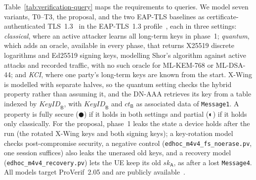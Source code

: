 \documentclass[symmetry,article,submit,moreauthors]{Definitions/mdpi}
\newcommand{\statuspartial}{\textcolor{orange!80!black}{$\LEFTcircle$}}  %
\newcommand{\statusfull}{\textcolor{green!60!black}{$\CIRCLE$}}          %
\begin{document}
Table~\ref{tab:verification-query} maps the requirements to queries. We model seven variants, T0--T3, the proposal, and the two EAP-TLS baselines as certificate-authenticated TLS~1.3~\cite{RFC9846} in the EAP-TLS~1.3 profile~\cite{RFC9190}, each in three settings: \emph{classical}, where an active attacker learns all long-term keys in phase~1; \emph{quantum}, which adds an oracle, available in every phase, that returns X25519 discrete logarithms and Ed25519 signing keys, modelling Shor's algorithm against active attacks and recorded traffic, with no such oracle for ML-KEM-768 or ML-DSA-44; and \emph{KCI}, where one party's long-term keys are known from the start. X-Wing is modelled with separate halves, so the quantum setting checks the hybrid property rather than assuming it, and the DN-AAA retrieves its key from a table indexed by $\mathit{KeyID}_{\mathsf{B}}$, with $\mathit{KeyID}_{\mathsf{B}}$ and $ct_{\mathsf{B}}$ as associated data of \texttt{Message1}. A property is fully secure (\statusfull) if it holds in both settings and partial (\statuspartial) if it holds only classically. For the proposal, phase~1 leaks the state a device holds after the run (the rotated X-Wing keys and both signing keys); a key-rotation model checks post-compromise security, a negative control (\texttt{edhoc\_m4v4\_fs\_noerase.pv}, one session suffices) also leaks the unerased old keys, and a recovery model (\texttt{edhoc\_m4v4\_recovery.pv}) lets the UE keep its old $sk_{\mathsf{A}}$, as after a lost \texttt{Message4}. All models target ProVerif~2.05 and are publicly available~\cite{ProVerifSrc}.
\end{document}
